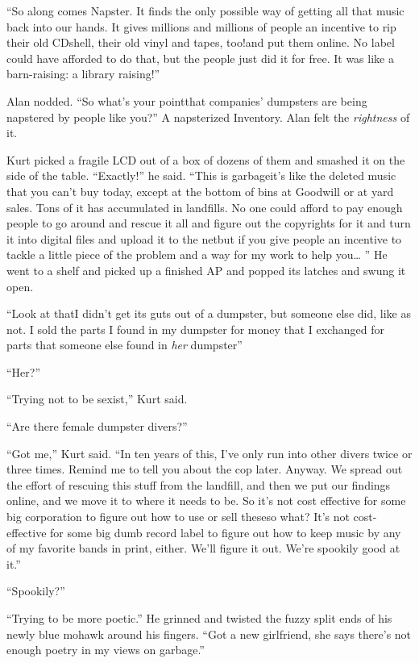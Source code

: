 ``So along comes Napster.  It finds the only possible way of getting
all that music back into our hands.  It gives millions and millions of
people an incentive to rip their old CDs\dash{}hell, their old vinyl and
tapes, too!\dash{}and put them online.  No label could have afforded to do
that, but the people just did it for free.  It was like a
barn-raising:  a library raising!''

Alan nodded.  ``So what's your point\dash{}that companies' dumpsters are
being napstered by people like you?'' A napsterized Inventory.  Alan
felt the \textit{rightness} of it.

Kurt picked a fragile LCD out of a box of dozens of them and smashed
it on the side of the table.  ``Exactly!'' he said.  ``This is
garbage\dash{}it's like the deleted music that you can't buy today, except
at the bottom of bins at Goodwill or at yard sales.  Tons of it has
accumulated in landfills.  No one could afford to pay enough people to
go around and rescue it all and figure out the copyrights for it and
turn it into digital files and upload it to the net\dash{}but if you give
people an incentive to tackle a little piece of the problem and a way
for my work to help you\ldots{}  '' He went to a shelf and picked up a
finished AP and popped its latches and swung it open.

``Look at that\dash{}I didn't get its guts out of a dumpster, but someone
else did, like as not.  I sold the parts I found in my dumpster for
money that I exchanged for parts that someone else found in
\textit{her} dumpster\dash{}''

``Her?''

``Trying not to be sexist,'' Kurt said.

``Are there female dumpster divers?''

``Got me,'' Kurt said.  ``In ten years of this, I've only run into
other divers twice or three times.  Remind me to tell you about the
cop later.  Anyway.  We spread out the effort of rescuing this stuff
from the landfill, and then we put our findings online, and we move it
to where it needs to be.  So it's not cost effective for some big
corporation to figure out how to use or sell these\dash{}so what?  It's
not cost-effective for some big dumb record label to figure out how to
keep music by any of my favorite bands in print, either.  We'll figure
it out.  We're spookily good at it.''

``Spookily?''

``Trying to be more poetic.'' He grinned and twisted the fuzzy split
ends of his newly blue mohawk around his fingers.  ``Got a new
girlfriend, she says there's not enough poetry in my views on
garbage.''

